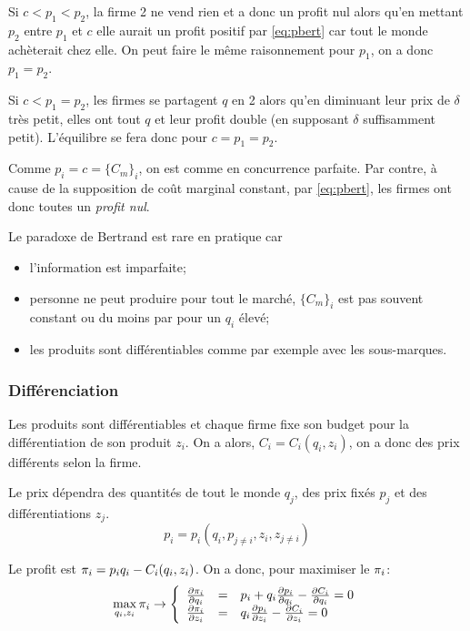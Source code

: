 Si $c < p_1 < p_2$, la firme 2 ne vend rien et a donc un profit nul
alors qu'en mettant $p_2$ entre $p_1$ et $c$ elle aurait un profit positif
par \eqref{eq:pbert} car tout le monde achèterait chez elle.
On peut faire le même raisonnement pour $p_1$,
on a donc $p_1 = p_2$.

Si $c < p_1 = p_2$, les firmes se partagent $q$ en 2 alors qu'en diminuant
leur prix de $\delta$ très petit, elles ont tout $q$ et leur profit double
(en supposant $\delta$ suffisamment petit).
L'équilibre se fera donc pour $c = p_1 = p_2$.

Comme $p_i = c = \{C_m\}_i$, on est comme en concurrence parfaite.
Par contre, à cause de la supposition de coût marginal constant,
par \eqref{eq:pbert}, les firmes ont donc toutes un \emph{profit nul}.

Le paradoxe de Bertrand est rare en pratique car
\begin{itemize}
  \item l'information est imparfaite;
  \item personne ne peut produire pour
    tout le marché, $\{C_m\}_i$ est pas souvent constant ou du moins
    par pour un $q_i$ élevé;
  \item les produits sont différentiables comme par
    exemple avec les sous-marques.
\end{itemize}


\subsubsection{Différenciation}
Les produits sont différentiables et chaque firme fixe son budget
pour la différentiation de son produit $z_i$.
On a alors, $C_i = C_i(q_i, z_i)$, on a donc des prix différents selon la firme.

Le prix dépendra des quantités de tout le monde $q_j$,
des prix fixés $p_j$ et des différentiations $z_j$.
$$p_i = p_i(q_i, p_{j\neq i}, z_i, z_{j \neq i})$$

Le profit est $\pi_i = p_iq_i - C_i(q_i, z_i)$.
On a donc, pour maximiser le $\pi_i$:
\begin{equation}
\max_{q_i, z_i} \pi_i \rightarrow
\left\lbrace
\begin{array}{lcl}
\frac{\partial \pi_i}{\partial q_i} &=&
p_i + q_i\frac{\partial p_i}{\partial q_i} - \frac{\partial C_i}{\partial q_i} = 0\\
\frac{\partial \pi_i}{\partial z_i} &=&
q_i\frac{\partial p_i}{\partial z_i} - \frac{\partial C_i}{\partial z_i} = 0
\end{array}
\right.
\end{equation}

